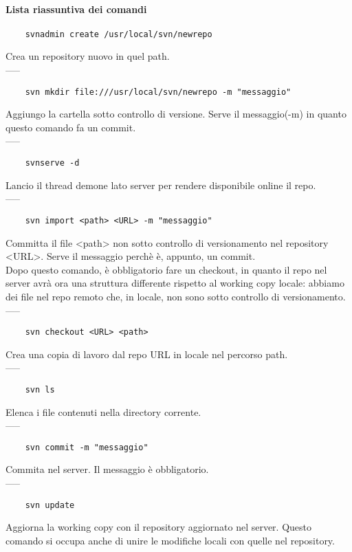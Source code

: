 \documentclass[a4paper]{article}
\begin{document}
	\paragraph{Lista riassuntiva dei comandi\\}
	\begin{verbatim}
	svnadmin create /usr/local/svn/newrepo
	\end{verbatim}
	Crea un repository nuovo in quel path.\\-----
	\begin{verbatim}
	svn mkdir file:///usr/local/svn/newrepo -m "messaggio"
	\end{verbatim}
	Aggiungo la cartella sotto controllo di versione. Serve il messaggio(-m) in quanto questo comando fa un commit.\\-----
	\begin{verbatim}
	svnserve -d
	\end{verbatim}
	Lancio il thread demone lato server per rendere disponibile online il repo.\\-----
	\begin{verbatim}
	svn import <path> <URL> -m "messaggio"
	\end{verbatim} 
	Committa il file <path> non sotto controllo di versionamento nel repository <URL>. Serve il messaggio perchè è, appunto, un commit.\\
	Dopo questo comando, è obbligatorio fare un checkout, in quanto il repo nel server avrà ora una struttura differente rispetto al working copy locale: abbiamo dei file nel repo remoto che, in locale, non sono sotto controllo di versionamento.\\-----
	\begin{verbatim}
	svn checkout <URL> <path> 
	\end{verbatim}
	Crea una copia di lavoro dal repo URL in locale nel percorso path.\\-----
	\begin{verbatim}
	svn ls
	\end{verbatim}
	Elenca i file contenuti nella directory corrente.\\-----
	\begin{verbatim}
	svn commit -m "messaggio"
	\end{verbatim}
	Commita nel server. Il messaggio è obbligatorio.\\-----
	\begin{verbatim}
	svn update
	\end{verbatim}
	Aggiorna la working copy con il repository aggiornato nel server. Questo comando si occupa anche di unire le modifiche locali con quelle nel repository.\\
\end{document}
